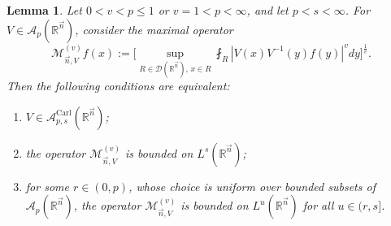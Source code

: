 \documentclass[11pt, reqno]{amsart}
\newtheorem{lemma}[theorem]{Lemma}
\theoremstyle{definition}
\theoremstyle{remark}
\numberwithin{equation}{section}
\newcommand{\A}{\mathscr A}
\newcommand{\D}{\mathscr D}
\newcommand{\R}{\mathbb R}
\newcommand{\vn}{\vec n}
\newcommand{\abs}[1]{|#1|}
\newcommand{\Carl}{\mathrm{Carl}}
\newcommand{\AC}{\A^{\Carl}}
\begin{document}
\begin{lemma}\label{carl equiv M}
Let $0<v<p\leq 1$ or $v=1<p<\infty$, and let $p<s<\infty$. For $V\in\A_p(\R^{\vn})$, consider the maximal operator
\begin{equation*}
\mathcal M_{\vn,V}^{(v)}f(x):=\bigg[\sup_{R\in\D(\R^{\vn}),\, x\in R}
\fint_R\abs{V(x)V^{-1}(y)f(y)}^v dy\bigg]^{\frac 1v}.
\end{equation*}
Then the following conditions are equivalent:
\begin{enumerate}[\rm(i)]
\item\label{ACps} $V\in\AC_{p,s}(\R^{\vn})$;
\item\label{M Ls} the operator $\mathcal M_{\vn,V}^{(v)}$ is bounded on $L^s(\R^{\vn})$;
\item\label{M Lu} for some $r\in(0,p)$, whose choice is uniform over bounded subsets of $\A_p(\R^{\vn})$, the operator $\mathcal M_{\vn,V}^{(v)}$ is bounded on $L^u(\R^{\vn})$ for all $u\in(r,s]$.
\end{enumerate}
\end{lemma}
\end{document}
